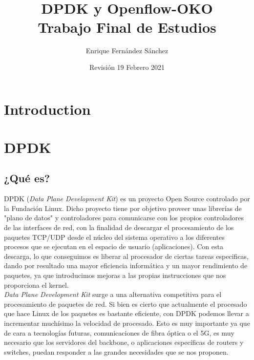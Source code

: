 \documentclass[12pt]{article}
\begin{document}
    \title{DPDK y Openflow-OKO \\ \large Trabajo Final de Estudios}
    \author{Enrique Fernández Sánchez}
    
    \date{Revisión 19 Febrero 2021}
    
    \maketitle
    \tableofcontents
    
    \pagebreak

    \section{Introduction}
    
    \pagebreak
    
    \section{DPDK}
    \subsection{¿Qué es?}
    DPDK (\emph{Data Plane Development Kit}) es un proyecto Open Source controlado por la Fundación Linux. Dicho proyecto tiene por objetivo proveer unas librerías de "plano de datos" y controladores para comunicarse con los propios controladores de las interfaces de red, con la finalidad de descargar el procesamiento de los paquetes TCP/UDP desde el núcleo del sistema operativo a los diferentes procesos que se ejecutan en el espacio de usuario (aplicaciones). Con esta descarga, lo que conseguimos es liberar al procesador de ciertas tareas especificas, dando por resultado una mayor eficiencia informática y un mayor rendimiento de paquetes, ya que introducimos mejoras a las propias instrucciones que nos proporciona el kernel.\\
    
    \noindent \emph{Data Plane Development Kit} surge a una alternativa competitiva para el procesamiento de paquetes de red. Si bien es cierto que actualmente el procesado que hace Linux de los paquetes es bastante eficiente, con DPDK podemos llevar a incrementar muchísimo la velocidad de procesado. Esto es muy importante ya que de cara a tecnologías futuras, comunicaciones de fibra óptica o el 5G, es muy necesario que los servidores del backbone, o aplicaciones específicas de routers y switches, puedan responder a las grandes necesidades que se nos proponen.\\
    
\end{document}

